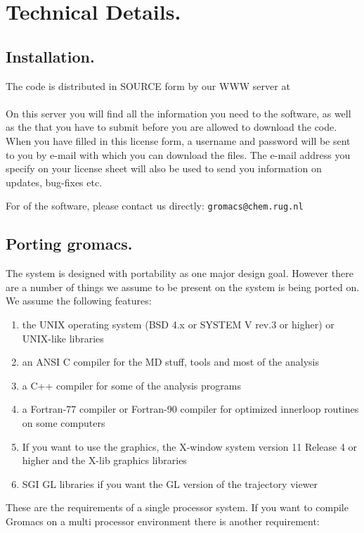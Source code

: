 \chapter{Technical Details.}
\label{ch:install}
\section{Installation.}
The {\gromacs} code is distributed in SOURCE form by our WWW server at\\
{\wwwpage}\\
On this server you will find all the information you need to 
the software, as well as the  that you have to submit
before you are allowed to download the code. When you have filled in this
license form, a username and password will be sent to you by e-mail
with which you can download the files. The e-mail address you specify
on your license sheet will also be used to send you information on
updates, bug-fixes etc.

For  of the software, please contact us directly:
{\tt gromacs@chem.rug.nl}

\section{Porting gromacs.}
The {\gromacs} system is designed with portability as one major design
goal. However there are a number of things we assume to be present on
the system {\gromacs} is being ported on. We assume the following
features:

\begin{enumerate}
\item 	the UNIX operating system (BSD 4.x or SYSTEM V rev.3 or higher) 
	or UNIX-like libraries
\item 	an ANSI C compiler for the MD stuff, tools and most of the analysis
\item	a C++ compiler for some of the analysis programs
\item	a Fortran-77 compiler or Fortran-90 compiler
	for optimized innerloop routines on some computers
\item 	If you want to use the graphics, the X-window system version 
	11 Release 4 or higher and the X-lib graphics libraries
\item	SGI GL libraries if you want the GL version of the trajectory
	viewer
\end{enumerate}

These are the requirements of a single processor system. If you want
to compile Gromacs on a multi processor environment there is another
requirement:

